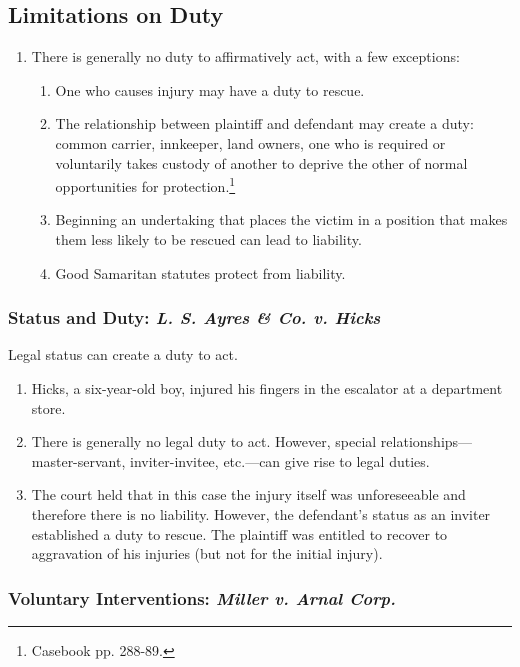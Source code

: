 \subsection{Limitations on Duty}

\begin{enumerate}
    \item There is generally no duty to affirmatively act, with a few 
    exceptions:
    \begin{enumerate}
        \item One who causes injury may have a duty to rescue.
        \item The relationship between plaintiff and defendant may create a duty: 
        common carrier, innkeeper, land owners, one who is required or 
        voluntarily takes custody of another to deprive the other of normal 
        opportunities for protection.\footnote{Casebook pp. 288-89.}
        \item Beginning an undertaking that places the victim in a position 
        that makes them less likely to be rescued can lead to liability.
        \item Good Samaritan statutes protect from liability.
    \end{enumerate}
\end{enumerate}

\subsubsection{Status and Duty: \emph{L. S. Ayres \& Co. v. Hicks}}

Legal status can create a duty to act.

\begin{enumerate}
    \item Hicks, a six-year-old boy, injured his fingers in the escalator at a 
    department store.
    \item There is generally no legal duty to act. However, special 
    relationships---master-servant, inviter-invitee, etc.---can give rise to 
    legal duties.
    \item The court held that in this case the injury itself was unforeseeable 
    and therefore there is no liability. However, the defendant's status as an 
    inviter established a duty to rescue. The plaintiff was entitled to 
    recover to aggravation of his injuries (but not for the initial injury).
\end{enumerate}

\subsubsection{Voluntary Interventions: \emph{Miller v. Arnal Corp.}}

